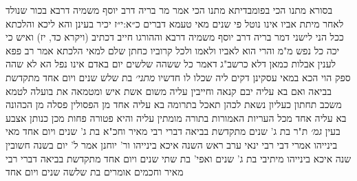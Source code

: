 \documentclass[12pt, openany]{book}
\begin{document}
{בסורא מתנו הכי בפומבדיתא מתנו הכי אמר מר בריה דרב יוסף משמיה דרבא בכור שנולד לאחר מיתת אביו אינו נוטל פי שנים מאי טעמא {דברים כ״א:י״ז } יכיר בעינן והא ליכא
והלכתא ככל הני לישני דמר בריה דרב יוסף משמיה דרבא
וההורגו חייב דכתיב (ויקרא כד, יז) ואיש כי יכה כל נפש מ"מ
והרי הוא לאביו ולאמו ולכל קרוביו כחתן שלם למאי הלכתא אמר רב פפא לענין אבלות 
כמאן דלא כרשב"ג דאמר כל ששהה שלשים יום באדם אינו נפל הא לא שהה ספק הוי הכא במאי עסקינן דקים ליה שכלו לו חדשיו
{\large\emph{מתני׳}} בת שלש שנים ויום אחד מתקדשת בביאה ואם בא עליה יבם קנאה וחייבין עליה משום אשת איש
ומטמאה את בועלה לטמא משכב תחתון כעליון 
נשאת לכהן תאכל בתרומה בא עליה אחד מן הפסולין פסלה מן הכהונה בא עליה אחד מכל העריות האמורות בתורה מומתין עליה והיא פטורה 
פחות מכן כנותן אצבע בעין
{\large\emph{גמ׳}} ת"ר בת ג' שנים מתקדשת בביאה דברי רבי מאיר וחכ"א בת ג' שנים ויום אחד מאי בינייהו אמרי דבי רבי ינאי ערב ראש השנה איכא בינייהו 
ור' יוחנן אמר ל' יום בשנה חשובין שנה איכא בינייהו 
מיתיבי בת ג' שנים ואפי' בת שתי שנים ויום אחד מתקדשת בביאה דברי רבי מאיר וחכמים אומרים בת שלשה שנים ויום אחד}
\end{document}
